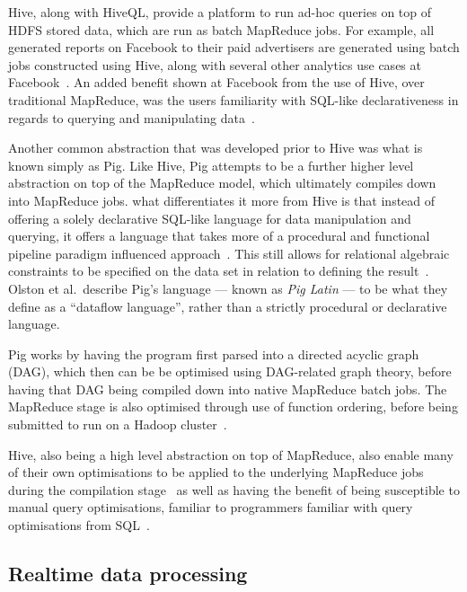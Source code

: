 Hive, along with HiveQL, provide a platform to run ad-hoc queries on top of HDFS stored data, which are run as batch
MapReduce jobs. For example, all generated reports on Facebook to their paid advertisers are generated using batch jobs
constructed using Hive, along with several other analytics use cases at Facebook~\cite{thusoo2010data}. An added benefit
shown at Facebook from the use of Hive, over traditional MapReduce, was the users familiarity with SQL-like
declarativeness in regards to querying and manipulating data~\cite{borthakur2011apache}.

Another common abstraction that was developed prior to Hive was what is known simply as Pig. Like Hive, Pig attempts to
be a further higher level abstraction on top of the MapReduce model, which ultimately compiles down into MapReduce jobs.
what differentiates it more from Hive is that instead of offering a solely declarative SQL-like language for data
manipulation and querying, it offers a language that takes more of a procedural and functional pipeline paradigm
influenced approach~\cite{olston2011nova}. This still allows for relational algebraic constraints to be specified on the data set in relation to defining the
result~\cite{olston2008pig}. Olston et al.\ describe Pig's language --- known as \emph{Pig Latin} --- to be what they
define as a ``dataflow language'', rather than a strictly procedural or declarative language.

Pig works by having the program first parsed into a directed acyclic graph (DAG), which then can be be optimised using
DAG-related graph theory, before having that DAG being compiled down into native MapReduce batch jobs. The MapReduce
stage is also optimised through use of function ordering, before being submitted to run on a Hadoop
cluster~\cite{stewart2011comparing}.

Hive, also being a high level abstraction on top of MapReduce, also enable many of their own
optimisations to be applied to the underlying MapReduce jobs during the compilation
stage~\cite{gates2009building,thusoo2010hive} as well as having the benefit of being susceptible to manual query
optimisations, familiar to programmers familiar with query optimisations from SQL~\cite{gruenheid2011query}.





\subsection{Realtime data processing} %
\label{sub:realtime_data_processing}

